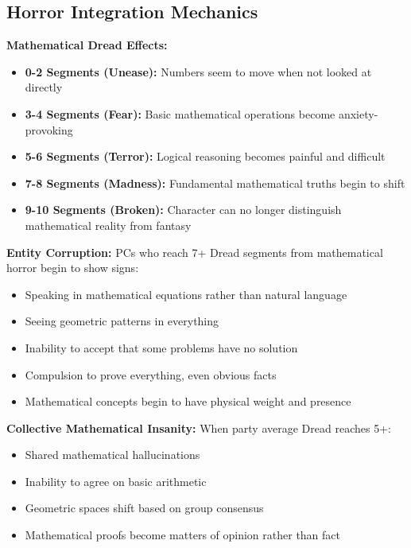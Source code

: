 \documentclass[11pt]{article}
\begin{document}
\subsection*{Horror Integration Mechanics}

\textbf{Mathematical Dread Effects:}
\begin{itemize}
    \item \textbf{0-2 Segments (Unease):} Numbers seem to move when not looked at directly
    \item \textbf{3-4 Segments (Fear):} Basic mathematical operations become anxiety-provoking
    \item \textbf{5-6 Segments (Terror):} Logical reasoning becomes painful and difficult
    \item \textbf{7-8 Segments (Madness):} Fundamental mathematical truths begin to shift
    \item \textbf{9-10 Segments (Broken):} Character can no longer distinguish mathematical reality from fantasy
\end{itemize}

\textbf{Entity Corruption:} PCs who reach 7+ Dread segments from mathematical horror begin to show signs:
\begin{itemize}
    \item Speaking in mathematical equations rather than natural language
    \item Seeing geometric patterns in everything
    \item Inability to accept that some problems have no solution
    \item Compulsion to prove everything, even obvious facts
    \item Mathematical concepts begin to have physical weight and presence
\end{itemize}

\textbf{Collective Mathematical Insanity:} When party average Dread reaches 5+:
\begin{itemize}
    \item Shared mathematical hallucinations
    \item Inability to agree on basic arithmetic
    \item Geometric spaces shift based on group consensus
    \item Mathematical proofs become matters of opinion rather than fact
\end{itemize}
\end{document}
